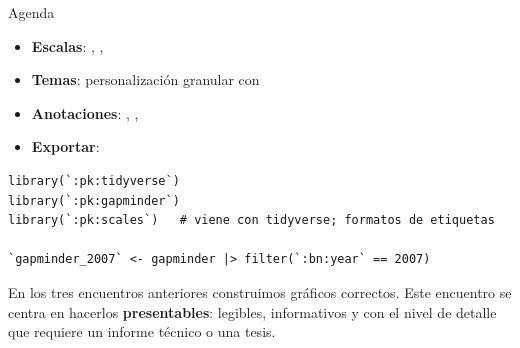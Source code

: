 \documentclass[8pt]{beamer}
\begin{document}
	\subtitle{10mo encuentro: Visualización de datos III}

	\begin{frame}[plain]
		\maketitle
	\end{frame}


	\begin{frame}[fragile]{Agenda}
		\begin{itemize}
			\item \textbf{Escalas}: , , 
			\item \textbf{Temas}: personalización granular con 
			\item \textbf{Anotaciones}: , , 
			\item \textbf{Exportar}: 
		\end{itemize}


\begin{lstlisting}[style=RScript]
library(`:pk:tidyverse`)
library(`:pk:gapminder`)
library(`:pk:scales`)   # viene con tidyverse; formatos de etiquetas

`gapminder_2007` <- gapminder |> filter(`:bn:year` == 2007)
\end{lstlisting}

		\begin{block}{}
			En los tres encuentros anteriores construimos gráficos correctos. Este encuentro se centra en hacerlos \textbf{presentables}: legibles, informativos y con el nivel de detalle que requiere un informe técnico o una tesis.
		\end{block}
	\end{frame}
\end{document}

